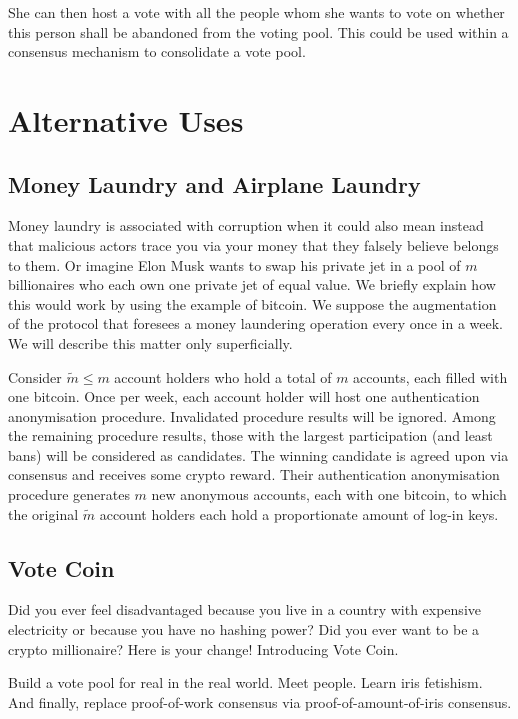 \documentclass{article}
\theoremstyle{definition}
\begin{document}
	She can then host a vote with all the people whom she wants to vote on whether this person shall be abandoned from the voting pool. This could be used within a consensus mechanism to consolidate a vote pool.
	
	\section{Alternative Uses}
	
	\subsection{Money Laundry and Airplane Laundry}
	Money laundry is associated with corruption when it could also mean instead that malicious actors trace you via your money that they falsely believe belongs to them. Or imagine Elon Musk wants to swap his private jet in a pool of $m$ billionaires who each own one private jet of equal value. We briefly explain how this would work by using the example of bitcoin. We suppose the augmentation of the protocol that foresees a money laundering operation every once in a week. We will describe this matter only superficially.
	
	Consider $\tilde{m}\leq m$ account holders who hold a total of $m$ accounts, each filled with one bitcoin. Once per week, each account holder will host one authentication anonymisation procedure. Invalidated procedure results will be ignored. Among the remaining procedure results, those with the largest participation (and least bans) will be considered as candidates. The winning candidate is agreed upon via consensus and receives some crypto reward. Their authentication anonymisation procedure generates $m$ new anonymous accounts, each with one bitcoin, to which the original $\tilde{m}$ account holders each hold a proportionate amount of log-in keys.
	
	\subsection{Vote Coin}
	Did you ever feel disadvantaged because you live in a country with expensive electricity or because you have no hashing power? Did you ever want to be a crypto millionaire? Here is your change! Introducing Vote Coin.
	
	Build a vote pool for real in the real world. Meet people. Learn iris fetishism.
	And finally, replace proof-of-work consensus via proof-of-amount-of-iris consensus.
	
\end{document}
